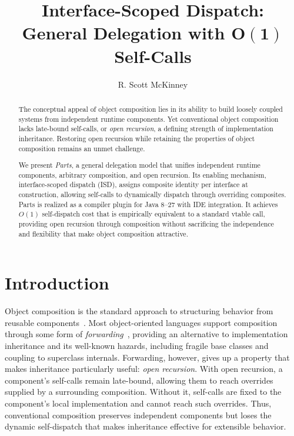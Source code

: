 \documentclass[acmsmall,nonacm]{acmart}
\theoremstyle{acmplain}
\begin{document}
\title{Interface-Scoped Dispatch:\texorpdfstring{\\}{ }General Delegation with \texorpdfstring{$\boldsymbol{O(1)}$}{O(1)} Self-Calls}

\author{R. Scott McKinney}
\renewcommand{\shortauthors}{McKinney}

\begin{abstract}
The conceptual appeal of object composition lies in its ability to build loosely coupled systems from independent runtime
components. Yet conventional object composition lacks late-bound self-calls, or \emph{open recursion}, a defining strength
of implementation inheritance. Restoring open recursion while retaining the properties of object composition remains an
unmet challenge.

We present \emph{Parts}, a general delegation model that unifies independent runtime components, arbitrary composition,
and open recursion. Its enabling mechanism, interface-scoped dispatch (ISD), assigns composite identity per interface at
construction, allowing self-calls to dynamically dispatch through overriding composites. Parts is realized as a compiler
plugin for Java 8--27 with IDE integration. It achieves $O(1)$ self-dispatch cost that is empirically equivalent to a standard
vtable call, providing open recursion through composition without sacrificing the independence and flexibility that make
object composition attractive.
\end{abstract}

\maketitle

\section{Introduction}
\label{sec:intro}

Object composition is the standard approach to structuring behavior from reusable components~\cite{gamma1994}. Most
object-oriented languages support composition through some form of \emph{forwarding}~\cite{kniesel2000}, providing an
alternative to implementation inheritance and its well-known hazards, including fragile base classes and coupling to
superclass internals. Forwarding, however, gives up a property that makes inheritance particularly useful:
\emph{open recursion}. With open recursion, a component's self-calls remain late-bound, allowing them to reach
overrides supplied by a surrounding composition. Without it, self-calls are fixed to the component's local
implementation and cannot reach such overrides. Thus, conventional composition preserves independent components but
loses the dynamic self-dispatch that makes inheritance effective for extensible behavior.
\end{document}
